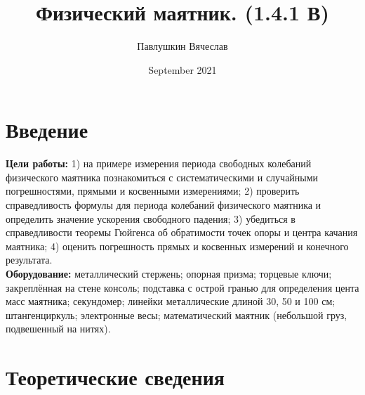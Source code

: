 \documentclass[a4paper,12pt]{article}
\title{Физический маятник. (1.4.1 В)}
\author{Павлушкин Вячеслав}
\date{September 2021}
\begin{document}
 	
 	\maketitle
 	
 	\section{Введение}
 	
 	\textbf{Цели работы:} 1) на примере измерения периода свободных колебаний физического
 	маятника познакомиться с систематическими и случайными погрешностями, прямыми и косвенными измерениями; 2) проверить справедливость формулы для периода колебаний физического маятника и определить значение ускорения свободного падения; 3) убедиться в справедливости теоремы Гюйгенса об обратимости
 	точек опоры и центра качания маятника; 4) оценить погрешность прямых и косвенных измерений и конечного результата.\\
 	\textbf{Оборудование:} металлический стержень; опорная призма; торцевые
 	ключи; закреплённая на стене консоль; подставка с острой гранью для определения
 	цента масс маятника; секундомер; линейки металлические длиной 30, 50 и 100 см;
 	штангенциркуль; электронные весы; математический маятник (небольшой груз,
 	подвешенный на нитях).
 	
 	\section{Теоретические сведения}
 	
\end{document}
